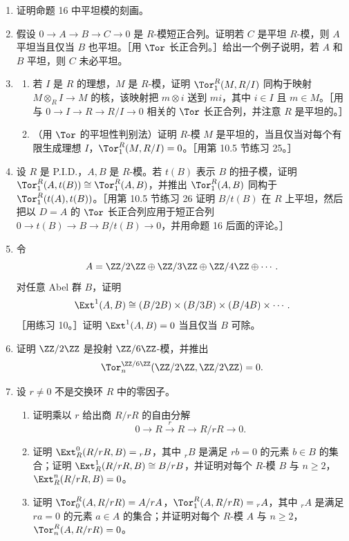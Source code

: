 \begin{enumerate}[label=\arabic*.]
  \item 证明命题 16 中平坦模的刻画。

  \item 假设 $0\to A\to B\to C\to0$ 是 $R$-模短正合列。证明若 $C$ 是平坦 $R$-模，则 $A$ 平坦当且仅当 $B$ 也平坦。［用 $\Tor$ 长正合列。］给出一个例子说明，若 $A$ 和 $B$ 平坦，则 $C$ 未必平坦。

  \item \begin{enumerate}[label=(\alph*)]
    \item 若 $I$ 是 $R$ 的理想，$M$ 是 $R$-模，证明 $\Tor_1^R(M,R/I)$ 同构于映射 $M\otimes_R I\to M$ 的核，该映射把 $m\otimes i$ 送到 $mi$，其中 $i\in I$ 且 $m\in M$。［用与 $0\to I\to R\to R/I\to0$ 相关的 $\Tor$ 长正合列，并注意 $R$ 是平坦的。］
    \item （用 $\Tor$ 的平坦性判别法）证明 $R$-模 $M$ 是平坦的，当且仅当对每个有限生成理想 $I$，$\Tor_1^R(M,R/I)=0$。［用第 10.5 节练习 25。］
  \end{enumerate}

  \item 设 $R$ 是 P.I.D.，$A,B$ 是 $R$-模。若 $t(B)$ 表示 $B$ 的扭子模，证明 $\Tor_1^R(A,t(B))\cong\Tor_1^R(A,B)$，并推出 $\Tor_1^R(A,B)$ 同构于 $\Tor_1^R(t(A),t(B))$。［用第 10.5 节练习 26 证明 $B/t(B)$ 在 $R$ 上平坦，然后把以 $D=A$ 的 $\Tor$ 长正合列应用于短正合列 $0\to t(B)\to B\to B/t(B)\to0$，并用命题 16 后面的评论。］

  \item 令
  \[
    A=\ZZ/2\ZZ\oplus\ZZ/3\ZZ\oplus\ZZ/4\ZZ\oplus\cdots .
  \]
  对任意 Abel 群 $B$，证明
  \[
    \Ext^1(A,B)\cong (B/2B)\times(B/3B)\times(B/4B)\times\cdots .
  \]
  ［用练习 10。］证明 $\Ext^1(A,B)=0$ 当且仅当 $B$ 可除。

  \item 证明 $\ZZ/2\ZZ$ 是投射 $\ZZ/6\ZZ$-模，并推出
  \[
    \Tor_n^{\ZZ/6\ZZ}(\ZZ/2\ZZ,\ZZ/2\ZZ)=0.
  \]

  \item 设 $r\neq0$ 不是交换环 $R$ 中的零因子。
  \begin{enumerate}[label=(\alph*)]
    \item 证明乘以 $r$ 给出商 $R/rR$ 的自由分解
    \[
      0\to R\xrightarrow{r}R\to R/rR\to0.
    \]
    \item 证明 $\Ext_R^0(R/rR,B)={}_rB$，其中 ${}_rB$ 是满足 $rb=0$ 的元素 $b\in B$ 的集合；证明 $\Ext_R^1(R/rR,B)\cong B/rB$，并证明对每个 $R$-模 $B$ 与 $n\geq2$，$\Ext_R^n(R/rR,B)=0$。
    \item 证明 $\Tor_0^R(A,R/rR)=A/rA$，$\Tor_1^R(A,R/rR)={}_rA$，其中 ${}_rA$ 是满足 $ra=0$ 的元素 $a\in A$ 的集合；并证明对每个 $R$-模 $A$ 与 $n\geq2$，$\Tor_n^R(A,R/rR)=0$。
  \end{enumerate}


\end{enumerate}
